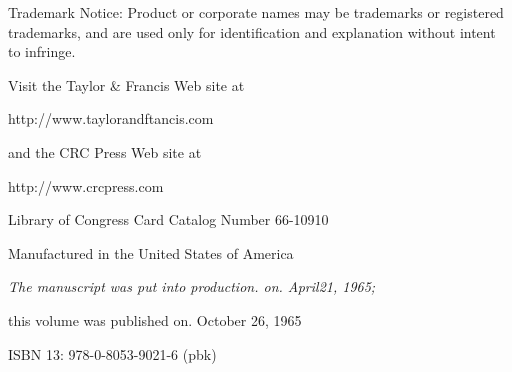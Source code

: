     Trademark Notice: Product or corporate names may be trademarks or
    registered trademarks, and are used only for identification and explanation
    without intent to infringe.

\begin{center}
    Visit the Taylor \& Francis Web site at

    http://www.taylorandftancis.com

    and the CRC Press Web site at

    http://www.crcpress.com

    Library of Congress Card Catalog Number 66-10910

    Manufactured in the United States of America

    \textit{The manuscript was put into production. on. April21, 1965;}

    this volume was published on. October 26, 1965

    ISBN 13: 978-0-8053-9021-6 (pbk)
\end{center}
\newpage